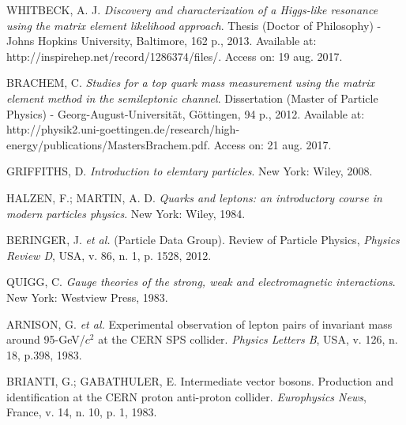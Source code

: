 

\begin{thebibliography}{}
\justifying

WHITBECK, A. J. \textit{Discovery and characterization of a Higgs-like resonance using the matrix element likelihood approach}. Thesis (Doctor of Philosophy) - Johns Hopkins University, Baltimore, 162 p., 2013. Available at: http://inspirehep.net/record/1286374/files/. Access on: 19 aug. 2017.

BRACHEM, C. \textit{Studies for a top quark mass measurement using the matrix element method in the semileptonic channel}. Dissertation (Master of Particle Physics) - Georg-August-Universität, Göttingen, 94 p., 2012. Available at: http://physik2.uni-goettingen.de/research/high-energy/publications/MastersBrachem.pdf. Access on: 21 aug. 2017.

GRIFFITHS, D. \textit{Introduction to elemtary particles}. New York: Wiley, 2008.

HALZEN, F.; MARTIN, A. D. \textit{Quarks and leptons: an introductory course in modern particles physics}. New York: Wiley, 1984.

BERINGER, J. \textit{et al.} (Particle Data Group). Review of Particle Physics, \textit{Physics Review D}, USA, v. 86, n. 1, p. 1528, 2012.

QUIGG, C. \textit{Gauge theories of the strong, weak and electromagnetic interactions}. New York: Westview Press, 1983.

ARNISON, G. \textit{et al.} Experimental observation of lepton pairs of invariant mass around 95-GeV/$c^2$ at the CERN SPS collider. \textit{Physics Letters B}, USA, v. 126, n. 18, p.398, 1983.

BRIANTI, G.; GABATHULER, E. Intermediate vector bosons. Production and identification at the CERN proton anti-proton collider. \textit{Europhysics News}, France, v. 14, n. 10, p. 1, 1983.


\end{thebibliography}
